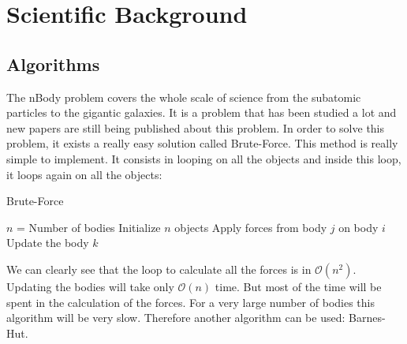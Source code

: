 \documentclass[11pt,a4paper]{article}
\begin{document}




\section{Scientific Background}
\subsection{Algorithms}

The nBody problem covers the whole scale of science from the subatomic particles to the gigantic galaxies. It is a problem that has been studied a lot and new papers are still being published about this problem. In order to solve this problem, it exists a really easy solution called Brute-Force. This method is really simple to implement. It consists in looping on all the objects and inside this loop, it loops again on all the objects:
\begin{algorithm}
\caption{Brute-Force}\label{bf}
\begin{algorithmic}[1]
\State $n$ = Number of bodies
\State Initialize $n$ objects
\State Apply forces from body $j$ on body $i$
\EndFor
\EndFor
{}
\State Update the body $k$
\EndFor
\EndWhile
\end{algorithmic}
\end{algorithm}

We can clearly see that the loop to calculate all the forces is in $\mathcal{O}(n^2)$. Updating the bodies will take only $\mathcal{O}(n)$ time. But most of the time will be spent in the calculation of the forces. For a very large number of bodies this algorithm will be very slow. Therefore another algorithm can be used: Barnes-Hut.
\end{document}

